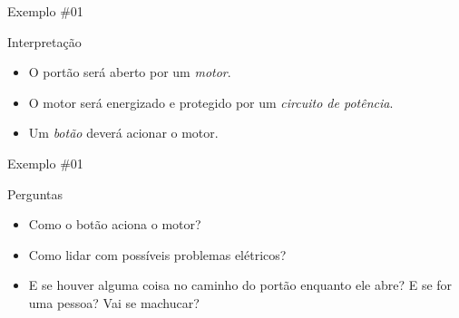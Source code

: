 \begin{frame}{Exemplo \#01}
	\begin{block}{Interpretação}
		\begin{itemize}
			\item O portão será aberto por um \textit{motor}.
			\item O motor será energizado e protegido por um \textit{circuito de potência}.
			\item Um \textit{botão} deverá acionar o motor.
		\end{itemize}
	\end{block}
\end{frame}

\begin{frame}{Exemplo \#01}
	\begin{block}{Perguntas}
		\begin{itemize}
			\item Como o botão aciona o motor?
			\item Como lidar com possíveis problemas elétricos?
			\item E se houver alguma coisa no caminho do portão enquanto ele abre? E se for uma pessoa? Vai se machucar?
		\end{itemize}
	\end{block}
\end{frame}

